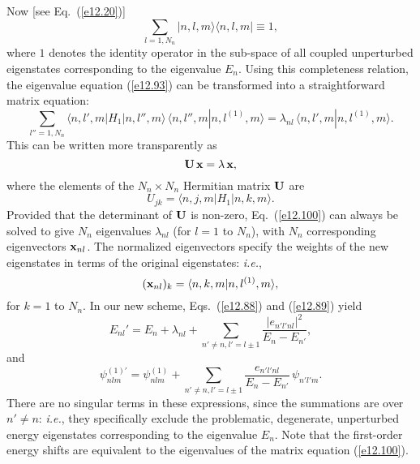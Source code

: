 Now [see Eq.~(\ref{e12.20})]
\begin{equation}
\sum_{l=1,N_n}|n,l,m\rangle\langle n,l,m|\equiv 1,
\end{equation}
where $1$ denotes the identity operator in the sub-space of all coupled unperturbed
eigenstates corresponding to the eigenvalue $E_n$. Using this completeness
relation, the eigenvalue equation (\ref{e12.93}) can be
transformed into a straightforward matrix equation:
\begin{equation}
\sum_{l''=1,N_n}\langle n,l',m|H_1|n,l'',m\rangle\,\langle n,l'',m|n,l^{(1)},m\rangle
= \lambda_{nl}\,\langle n,l',m|n,l^{(1)},m\rangle.
\end{equation}
This can be written more transparently as
\begin{equation}\label{e12.100}
{\bf U}\,{\bf x} = \lambda \,{\bf x},
\end{equation}
where the elements of the $N_n\times N_n$ Hermitian matrix ${\bf U}$
are
\begin{equation}
U_{jk} = \langle n,j,m|H_1|n,k,m\rangle.
\end{equation}
Provided that the determinant of ${\bf U}$ is non-zero, Eq.~(\ref{e12.100})
can always be solved to give $N_n$ eigenvalues $\lambda_{nl}$ (for $l=1$ to $N_n$), with $N_n$ corresponding eigenvectors ${\bf x}_{nl}$. The
normalized eigenvectors specify the weights of the new eigenstates in terms of the
original eigenstates: {\em i.e.}, 
\begin{equation}
({\bf x}_{nl})_k = \langle n,k,m|n,l^{(1)},m\rangle,
\end{equation}
for $k=1$ to $N_n$. In our new scheme, Eqs.~(\ref{e12.88}) and (\ref{e12.89}) yield
\begin{equation}
E_{nl}' = E_n +\lambda_{nl}+\sum_{n'\neq n,l'=l\pm 1}\frac{|e_{n'l'nl}|^2}{E_n-E_{n'}},
\end{equation}
and
\begin{equation}
\psi_{nlm}^{(1)'} = \psi_{nlm}^{(1)} + \sum_{n'\neq n,l'=l\pm 1}
\frac{e_{n'l'nl}}{E_n-E_{n'}}\,\psi_{n'l'm}.
\end{equation}
There are no singular terms in  these expressions, since the summations
are over $n'\neq n$: {\em i.e.}, they specifically exclude the problematic,
degenerate, unperturbed energy eigenstates corresponding to the eigenvalue
$E_n$. Note that the first-order energy shifts are equivalent to the
eigenvalues of the matrix equation (\ref{e12.100}).

